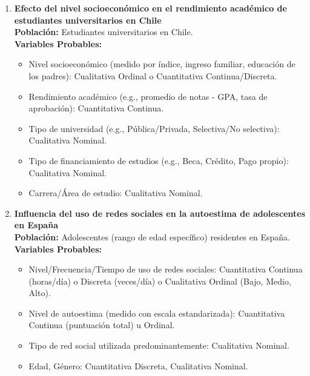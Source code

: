 \documentclass[12pt, letterpaper]{article}
\begin{document}
\begin{enumerate}
\item \textbf{Efecto del nivel socioeconómico en el rendimiento académico de estudiantes universitarios en Chile} \\
\textbf{Población:} Estudiantes universitarios en Chile. \\
\textbf{Variables Probables:}
\begin{itemize}
  \item Nivel socioeconómico (medido por índice, ingreso familiar, educación de los padres): Cualitativa Ordinal o Cuantitativa Continua/Discreta.
  \item Rendimiento académico (e.g., promedio de notas - GPA, tasa de aprobación): Cuantitativa Continua.
  \item Tipo de universidad (e.g., Pública/Privada, Selectiva/No selectiva): Cualitativa Nominal.
  \item Tipo de financiamiento de estudios (e.g., Beca, Crédito, Pago propio): Cualitativa Nominal.
  \item Carrera/Área de estudio: Cualitativa Nominal.
\end{itemize}


\item \textbf{Influencia del uso de redes sociales en la autoestima de adolescentes en España} \\
\textbf{Población:} Adolescentes (rango de edad específico) residentes en España. \\
\textbf{Variables Probables:}
\begin{itemize}
  \item Nivel/Frecuencia/Tiempo de uso de redes sociales: Cuantitativa Continua (horas/día) o Discreta (veces/día) o Cualitativa Ordinal (Bajo, Medio, Alto).
  \item Nivel de autoestima (medido con escala estandarizada): Cuantitativa Continua (puntuación total) u Ordinal.
  \item Tipo de red social utilizada predominantemente: Cualitativa Nominal.
  \item Edad, Género: Cuantitativa Discreta, Cualitativa Nominal.
\end{itemize}



\end{enumerate}
\end{document}
